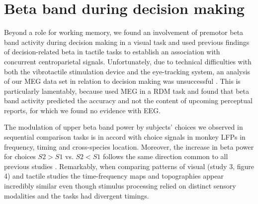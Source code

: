 \section{Beta band during decision making}
Beyond a role for working memory, we found an involvement of premotor beta band activity during decision making in a visual task and used previous findings of decision-related beta in tactile tasks to establish an association with concurrent centroparietal signals. Unfortunately, due to technical difficulties with both the vibrotactile stimulation device and the eye-tracking system, an analysis of our MEG data set in relation to decision making was unsuccessful \parencite[cf.][]{Chandler2015}. This is particularly lamentably, because \textcite{Donner2007} used MEG in a RDM task and found that beta band activity predicted the accuracy and not the content of upcoming perceptual reports, for which we found no evidence with EEG.

The modulation of upper beta band power by subjects’ choices we observed in sequential comparison tasks is in accord with choice signals in monkey LFPs \parencite{Haegens2011} in frequency, timing and cross-species location. Moreover, the increase in beta power for choices $S2>S1$ vs. $S2<S1$ follows the same direction common to all previous studies \parencite{Haegens2011,Herding2016,Herding2017,Ludwig2018}. Remarkably, when comparing patterns of visual (study 3, figure 4) and tactile studies \parencite[][figure 4]{Herding2016} the time-frequency maps and topographies appear incredibly similar even though stimulus processing relied on distinct sensory modalities and the tasks had divergent timings.

